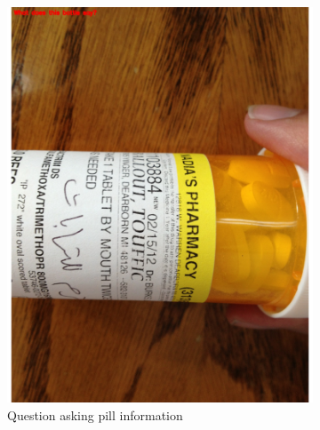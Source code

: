 \documentclass[sigconf]{acmart}
\begin{document}
\begin{figure}[hbp]
        \centering
        \begin{subfigure}[b]{0.3\columnwidth}
                \includegraphics[width=\textwidth]{images/health_1.pdf}  
                \caption{Question asking pill information}
                \label{fig:pill}
        \end{subfigure}%
        ~ 
        \begin{subfigure}[b]{0.3\columnwidth}

\end{subfigure}
\end{figure}
\end{document}
